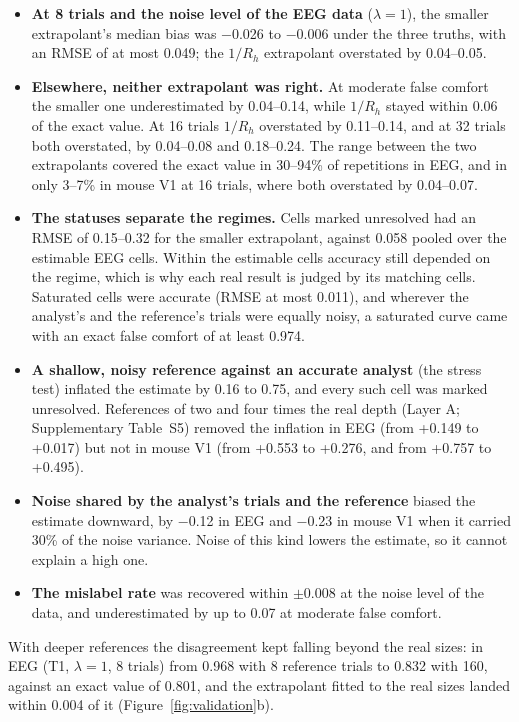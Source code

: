 \documentclass[11pt]{article}
\newcommand{\ValBiasLo}{$-$0.026}
\newcommand{\ValBiasHi}{$-$0.006}
\newcommand{\ValRmseMax}{0.049}
\newcommand{\ValInvLo}{0.04}
\newcommand{\ValInvHi}{0.05}
\newcommand{\ValModLo}{0.04}
\newcommand{\ValModHi}{0.14}
\newcommand{\ValModInv}{0.06}
\newcommand{\ValSixteenInvLo}{0.11}
\newcommand{\ValSixteenInvHi}{0.14}
\newcommand{\ValThirtyTwoSmLo}{0.04}
\newcommand{\ValThirtyTwoSmHi}{0.08}
\newcommand{\ValThirtyTwoInvLo}{0.18}
\newcommand{\ValThirtyTwoInvHi}{0.24}
\newcommand{\ValBracketLo}{30}
\newcommand{\ValBracketHi}{94}
\newcommand{\ValMouseSixteenLo}{0.04}
\newcommand{\ValMouseSixteenHi}{0.07}
\newcommand{\ValMouseBracketLo}{3}
\newcommand{\ValMouseBracketHi}{7}
\newcommand{\ValUnresRmseLo}{0.15}
\newcommand{\ValUnresRmseHi}{0.32}
\newcommand{\ValEstRmseEeg}{0.058}
\newcommand{\ValSatRmse}{0.011}
\newcommand{\ValSatExactMin}{0.974}
\newcommand{\ValStressLo}{0.16}
\newcommand{\ValStressHi}{0.75}
\newcommand{\ValDepEeg}{$-$0.12}
\newcommand{\ValDepMouse}{$-$0.23}
\newcommand{\ValQBias}{0.008}
\newcommand{\ValQMod}{0.07}
\newcommand{\LaCurveFirst}{0.968}
\newcommand{\LaCurveLast}{0.832}
\newcommand{\LaExact}{0.801}
\newcommand{\LaGrid}{0.004}
\newcommand{\LaEegToneGrid}{+0.149}
\newcommand{\LaEegToneDeep}{+0.017}
\newcommand{\LaMouseToneGrid}{+0.553}
\newcommand{\LaMouseToneDeep}{+0.276}
\newcommand{\LaMouseTtwoGrid}{+0.757}
\newcommand{\LaMouseTtwoDeep}{+0.495}
\begin{document}
\begin{itemize}[leftmargin=*]
  \item \textbf{At 8 trials and the noise level of the EEG data} ($\lambda=1$), the smaller extrapolant's median bias was \ValBiasLo{} to \ValBiasHi{} under the three truths, with an RMSE of at most \ValRmseMax; the $1/R_h$ extrapolant overstated by \ValInvLo--\ValInvHi.
  \item \textbf{Elsewhere, neither extrapolant was right.}
  At moderate false comfort the smaller one underestimated by \ValModLo--\ValModHi, while $1/R_h$ stayed within \ValModInv{} of the exact value.
  At 16 trials $1/R_h$ overstated by \ValSixteenInvLo--\ValSixteenInvHi, and at 32 trials both overstated, by \ValThirtyTwoSmLo--\ValThirtyTwoSmHi{} and \ValThirtyTwoInvLo--\ValThirtyTwoInvHi.
  The range between the two extrapolants covered the exact value in \ValBracketLo--\ValBracketHi\% of repetitions in EEG, and in only \ValMouseBracketLo--\ValMouseBracketHi\% in mouse V1 at 16 trials, where both overstated by \ValMouseSixteenLo--\ValMouseSixteenHi.
  \item \textbf{The statuses separate the regimes.}
  Cells marked unresolved had an RMSE of \ValUnresRmseLo--\ValUnresRmseHi{} for the smaller extrapolant, against \ValEstRmseEeg{} pooled over the estimable EEG cells.
  Within the estimable cells accuracy still depended on the regime, which is why each real result is judged by its matching cells.
  Saturated cells were accurate (RMSE at most \ValSatRmse), and wherever the analyst's and the reference's trials were equally noisy, a saturated curve came with an exact false comfort of at least \ValSatExactMin.
  \item \textbf{A shallow, noisy reference against an accurate analyst} (the stress test) inflated the estimate by \ValStressLo{} to \ValStressHi, and every such cell was marked unresolved.
  References of two and four times the real depth (Layer A; Supplementary Table~S5) removed the inflation in EEG (from \LaEegToneGrid{} to \LaEegToneDeep) but not in mouse V1 (from \LaMouseToneGrid{} to \LaMouseToneDeep, and from \LaMouseTtwoGrid{} to \LaMouseTtwoDeep).
  \item \textbf{Noise shared by the analyst's trials and the reference} biased the estimate downward, by \ValDepEeg{} in EEG and \ValDepMouse{} in mouse V1 when it carried 30\% of the noise variance.
  Noise of this kind lowers the estimate, so it cannot explain a high one.
  \item \textbf{The mislabel rate} was recovered within $\pm$\ValQBias{} at the noise level of the data, and underestimated by up to \ValQMod{} at moderate false comfort.
\end{itemize}
With deeper references the disagreement kept falling beyond the real sizes: in EEG (T1, $\lambda=1$, 8 trials) from \LaCurveFirst{} with 8 reference trials to \LaCurveLast{} with 160, against an exact value of \LaExact, and the extrapolant fitted to the real sizes landed within \LaGrid{} of it (Figure~\ref{fig:validation}b).
\end{document}
